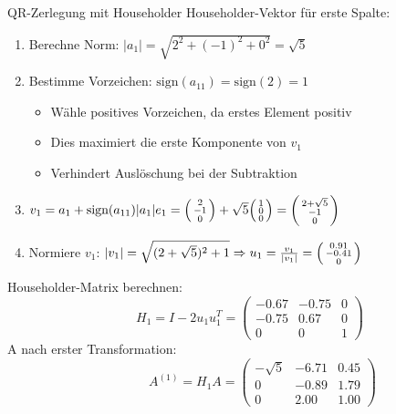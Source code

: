 \begin{example2}[breakable]{QR-Zerlegung mit Householder}
Householder-Vektor für erste Spalte:
\vspace{1mm}
\begin{enumerate}
    \item Berechne Norm: $|a_1| = \sqrt{2^2 + (-1)^2 + 0^2} = \sqrt{5}$
    \vspace{1mm}
    \item Bestimme Vorzeichen: $\text{sign}(a_{11}) = \text{sign}(2) = 1$
         \begin{itemize}
              \item Wähle positives Vorzeichen, da erstes Element positiv
              \item Dies maximiert die erste Komponente von $v_1$
              \item Verhindert Auslöschung bei der Subtraktion
         \end{itemize}
         \vspace{1mm}
    \item $v_1 = a_1 + \text{sign}(a_{11})|a_1|e_1 = \begin{psmallmatrix} 2\\ -1\\ 0 \end{psmallmatrix} + \sqrt{5}\begin{psmallmatrix} 1\\ 0\\ 0 \end{psmallmatrix} = \begin{psmallmatrix} 2 + \sqrt{5}\\ -1\\ 0 \end{psmallmatrix}$
    \vspace{1mm}
    \item Normiere $v_1$: $|v_1| = \sqrt{(2 + \sqrt{5})^2 + 1} \Rightarrow
            u_1 = \frac{v_1}{|v_1|} = \begin{psmallmatrix} 0.91\\ -0.41\\ 0 \end{psmallmatrix}$
\end{enumerate}
\vspace{1mm}
Householder-Matrix berechnen:
\vspace{-6mm}\\
$$\quad\quad H_1 = I - 2u_1u_1^T = \begin{pmatrix} 
-0.67 & -0.75 & 0\\
-0.75 & 0.67 & 0\\
0 & 0 & 1
\end{pmatrix}$$
A nach erster Transformation:
\vspace{-6mm}\\
$$\quad\quad \quad\quad A^{(1)} = H_1A = \begin{pmatrix}
-\sqrt{5} & -6.71 & 0.45\\
0 & -0.89 & 1.79\\
0 & 2.00 & 1.00
\end{pmatrix}$$

\end{example2}

